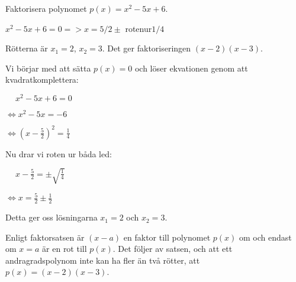 \documentclass[titlepage]{article}
\begin{document}
\begin{center}
\begin{tcolorbox}[width=\linewidth,colback={white},title={\textbf{Exempel 2}},outer arc=0mm,colupper=black]
    Faktorisera polynomet $p(x)=x^2-5x+6$.
\end{tcolorbox} 
\end{center}

\begin{center}
\begin{tcolorbox}[width=\linewidth,colback={red!25!white},title={\textbf{Exempel 2: Lösning - Sämre}},outer arc=0mm,colupper=black]
    $x^2-5x+6 = 0 => x=5/2 \pm$ rotenur$1/4$

    Rötterna är $x_1 = 2$, $x_2 = 3$. Det ger faktoriseringen $(x-2)(x-3)$.
\end{tcolorbox} 
\end{center}



\begin{center}
\begin{tcolorbox}[width=\linewidth,colback={green!25!white},title={\textbf{Exempel 2: Lösning - Bättre}},outer arc=0mm,colupper=black]    
    Vi börjar med att sätta $p(x)=0$ och löser ekvationen genom att kvadratkomplettera:
    \vspace{2mm}

    $\quad \: x^2-5x+6 = 0$

    $\Leftrightarrow x^2-5x = -6$

    $\Leftrightarrow(x-\frac{5}{2})^2 = \frac{1}{4}$
    \vspace{2mm}

    Nu drar vi roten ur båda led:
    \vspace{2mm}

    $\quad \: x-\frac{5}{2} = \pm \sqrt{\frac{1}{4}}$

    $\Leftrightarrow x = \frac{5}{2} \pm \frac{1}{2}$
    \vspace{2mm}

    Detta ger oss lösningarna $x_1 = 2$ och $x_2=3$.

    Enligt faktorsatsen är $(x-a)$ en faktor till polynomet $p(x)$ om och endast om $x = a$ är en rot till $p(x)$. Det följer av satsen, och att ett andragradspolynom inte kan ha fler än två rötter, att $p(x) = (x-2)(x-3)$.
\end{tcolorbox} 
\end{center}
\end{document}
